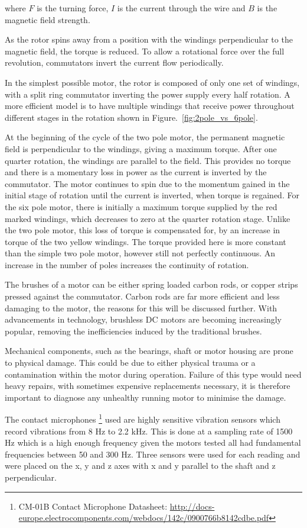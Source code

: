 where $F$ is the turning force, $I$ is the current through the wire and $B$ is the magnetic field strength.

As the rotor spins away from a position with the windings perpendicular to the magnetic field, the torque is reduced. To allow a rotational force over the full revolution, commutators invert the current flow periodically. 

In the simplest possible motor, the rotor is composed of only one set of windings, with a split ring commutator inverting the power supply every half rotation. A more efficient model is to have multiple windings that receive power throughout different stages in the rotation shown in Figure.~\ref{fig:2pole_vs_6pole}. 

At the beginning of the cycle of the two pole motor, the permanent magnetic field is perpendicular to the windings, giving a maximum torque. After one quarter rotation, the windings are parallel to the field. This provides no torque and there is a momentary loss in power as the current is inverted by the commutator. The motor continues to spin due to the momentum gained in the initial stage of rotation until the current is inverted, when torque is regained. For the six pole motor, there is initially a maximum torque supplied by the red marked windings, which decreases to zero at the quarter rotation stage. Unlike the two pole motor, this loss of torque is compensated for, by an increase in torque of the two yellow windings. The torque provided here is more constant than the simple two pole motor, however still not perfectly continuous. An increase in the number of poles increases the continuity of rotation.

The brushes of a motor can be either spring loaded carbon rods, or copper strips pressed against the commutator. Carbon rods are far more efficient and less damaging to the motor, the reasons for this will be discussed further. With advancements in technology, brushless DC motors are becoming increasingly popular, removing the inefficiencies induced by the traditional brushes. 

Mechanical components, such as the bearings, shaft or motor housing are prone to physical damage. This could be due to either physical trauma or a contamination within the motor during operation. Failure of this type would need heavy repairs, with sometimes expensive replacements necessary, it is therefore important to diagnose any unhealthy running motor to minimise the damage.

The contact microphones \footnote{CM-01B Contact Microphone Datasheet: \url{http://docs-europe.electrocomponents.com/webdocs/142c/0900766b8142cdbe.pdf}} used are highly sensitive vibration sensors which record vibrations from 8 Hz to 2.2 kHz. This is done at a sampling rate of 1500 Hz which is a high enough frequency given the motors tested all had fundamental frequencies between 50 and 300 Hz. Three sensors were used for each reading and were placed on the x, y and z axes with x and y parallel to the shaft and z perpendicular. 

